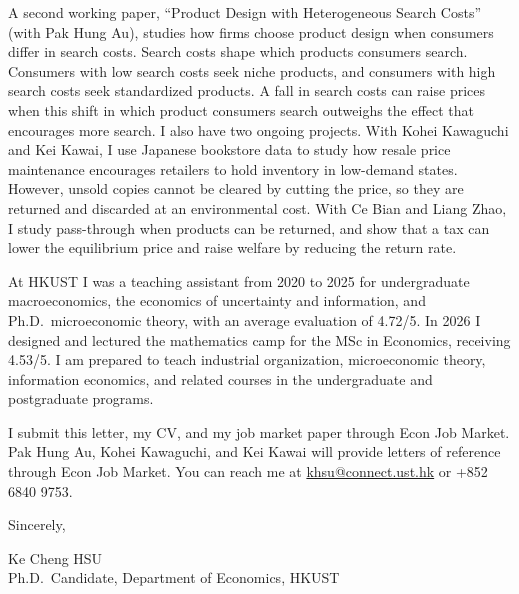 \documentclass[11pt]{article}
\begin{document}
A second working paper, ``Product Design with Heterogeneous Search Costs'' (with Pak Hung Au), studies how firms choose product design when consumers differ in search costs. Search costs shape which products consumers search. Consumers with low search costs seek niche products, and consumers with high search costs seek standardized products. A fall in search costs can raise prices when this shift in which product consumers search outweighs the effect that encourages more search. I also have two ongoing projects. With Kohei Kawaguchi and Kei Kawai, I use Japanese bookstore data to study how resale price maintenance encourages retailers to hold inventory in low-demand states. However, unsold copies cannot be cleared by cutting the price, so they are returned and discarded at an environmental cost. With Ce Bian and Liang Zhao, I study pass-through when products can be returned, and show that a tax can lower the equilibrium price and raise welfare by reducing the return rate.

At HKUST I was a teaching assistant from 2020 to 2025 for undergraduate macroeconomics, the economics of uncertainty and information, and Ph.D.\ microeconomic theory, with an average evaluation of 4.72/5. In 2026 I designed and lectured the mathematics camp for the MSc in Economics, receiving 4.53/5. I am prepared to teach industrial organization, microeconomic theory, information economics, and related courses in the undergraduate and postgraduate programs.

I submit this letter, my CV, and my job market paper through Econ Job Market. Pak Hung Au, Kohei Kawaguchi, and Kei Kawai will provide letters of reference through Econ Job Market. You can reach me at \href{mailto:khsu@connect.ust.hk}{khsu@connect.ust.hk} or +852 6840 9753.

\vspace{0.35em}
Sincerely,

\vspace{0.35em}
Ke Cheng HSU \\
Ph.D.\ Candidate, Department of Economics, HKUST
\end{document}
